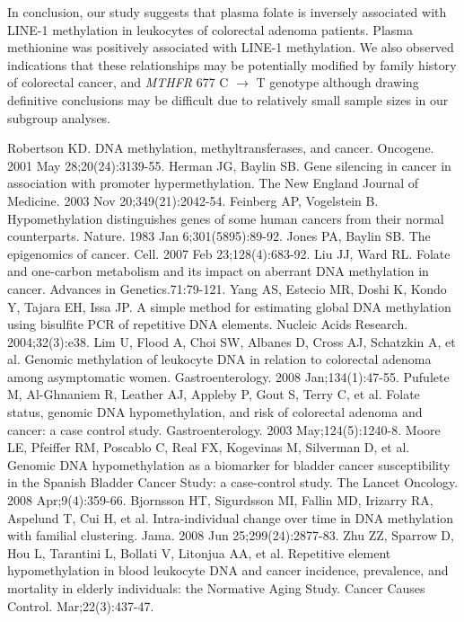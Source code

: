 \noindent In conclusion, our study suggests that plasma folate is inversely associated with LINE-1 methylation in leukocytes of colorectal adenoma patients. Plasma methionine was positively associated with LINE-1 methylation. We also observed indications that these relationships may be potentially modified by family history of colorectal cancer, and \emph{MTHFR} 677 C $\rightarrow$ T genotype although drawing definitive conclusions may be difficult due to relatively small sample sizes in our subgroup analyses.

\begin{thebibliography}{12} 
		Robertson KD. DNA methylation, methyltransferases, and cancer. Oncogene. 2001 May 28;20(24):3139-55. 
		Herman JG, Baylin SB. Gene silencing in cancer in association with promoter hypermethylation. The New England Journal of Medicine. 2003 Nov 20;349(21):2042-54. 
		Feinberg AP, Vogelstein B. Hypomethylation distinguishes genes of some human cancers from their normal counterparts. Nature. 1983 Jan 6;301(5895):89-92. 
		Jones PA, Baylin SB. The epigenomics of cancer. Cell. 2007 Feb 23;128(4):683-92. 
		Liu JJ, Ward RL. Folate and one-carbon metabolism and its impact on aberrant DNA methylation in cancer. Advances in Genetics.71:79-121. 
		Yang AS, Estecio MR, Doshi K, Kondo Y, Tajara EH, Issa JP. A simple method for estimating global DNA methylation using bisulfite PCR of repetitive DNA elements. Nucleic Acids Research. 2004;32(3):e38. 
		Lim U, Flood A, Choi SW, Albanes D, Cross AJ, Schatzkin A, et al. Genomic methylation of leukocyte DNA in relation to colorectal adenoma among asymptomatic women. Gastroenterology. 2008 Jan;134(1):47-55. 
		Pufulete M, Al-Ghnaniem R, Leather AJ, Appleby P, Gout S, Terry C, et al. Folate status, genomic DNA hypomethylation, and risk of colorectal adenoma and cancer: a case control study. Gastroenterology. 2003 May;124(5):1240-8. 
		Moore LE, Pfeiffer RM, Poscablo C, Real FX, Kogevinas M, Silverman D, et al. Genomic DNA hypomethylation as a biomarker for bladder cancer susceptibility in the Spanish Bladder Cancer Study: a case-control study. The Lancet Oncology. 2008 Apr;9(4):359-66. 
		Bjornsson HT, Sigurdsson MI, Fallin MD, Irizarry RA, Aspelund T, Cui H, et al. Intra-individual change over time in DNA methylation with familial clustering. Jama. 2008 Jun 25;299(24):2877-83. 
		Zhu ZZ, Sparrow D, Hou L, Tarantini L, Bollati V, Litonjua AA, et al. Repetitive element hypomethylation in blood leukocyte DNA and cancer incidence, prevalence, and mortality in elderly individuals: the Normative Aging Study. Cancer Causes Control.  Mar;22(3):437-47. 

\end{thebibliography}
